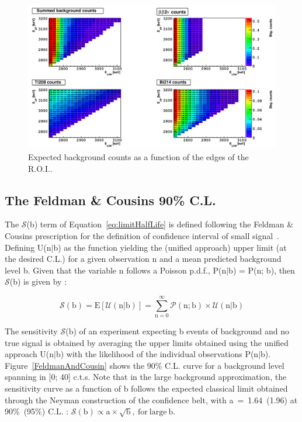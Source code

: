 \documentclass[main.tex]{subfiles}
\begin{document}
\begin{figure}[h!]
\centering
\includegraphics[scale=0.4,  angle =90]{pictures/Chap4/BkgCount2D}
\caption{Expected background counts as a function of the edges of the R.O.I..}
\label{BkgCount2D}
\end{figure}


\FloatBarrier


\subsection{The Feldman \& Cousins 90\% C.L.}
 

\NI The $\mathcal{S}$(b) term of Equation~\ref{eq:limitHalfLife} is defined following the Feldman \& Cousins prescription for the definition of confidence interval of small signal~\cite{FeldmanCousins}. Defining U(n$|$b) as the function yielding the (unified approach) upper limit (at the desired C.L.) for a given observation n and a mean predicted background level b. Given that the variable n follows a Poisson p.d.f., P(n$|$b) = P(n; b), then $\mathcal{S}$(b) is given by : 


\begin{equation}
\mathcal{S}(\text{b}) = \text{E}[\mathcal{U}(\text{n}|\text{b})] = \sum_{\text{n}=0}^{\infty} \mathcal{P} (\text{n};\text{b}) \times \mathcal{U}(\text{n}|\text{b})
\end{equation}


\NI The sensitivity $\mathcal{S}$(b) of an experiment expecting b events of background and no true signal is obtained by averaging the upper limits obtained using the unified approach U(n$|$b) with the likelihood of the individual observations P(n$|$b). Figure~\ref{FeldmanAndCousin} shows the 90\% C.L. curve for a background level spanning in [0; 40] c.t.s. Note that in the large background approximation, the sensitivity curve as a function of b follows the expected classical limit obtained through the Neyman construction of the confidence belt, with a~=~1.64~(1.96) at 90\%~(95\%) C.L. : $\mathcal{S}(\text{b}) \propto \text{a} \times \sqrt{\text{b}}, ~\text{for}~\text{large}~\text{b}$. 	
\end{document}
